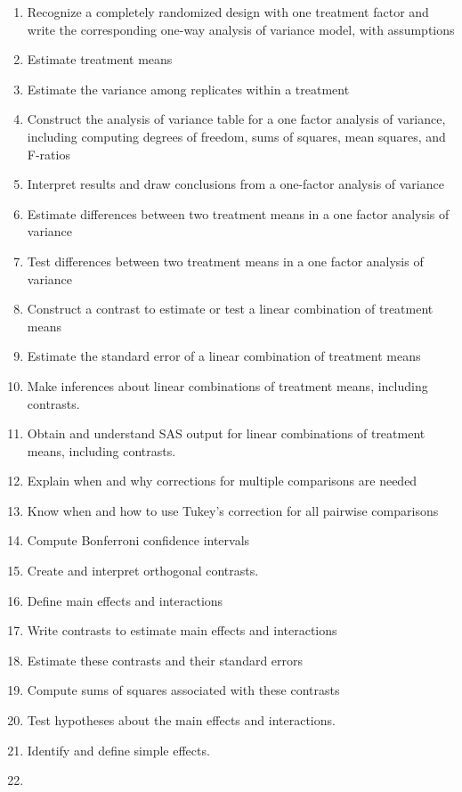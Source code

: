 \documentclass[]{book}
\begin{document}
\begin{enumerate}
\def\labelenumi{\arabic{enumi}.}
\item
  Recognize a completely randomized design with one treatment factor and write the corresponding one-way analysis of variance model, with assumptions
\item
  Estimate treatment means
\item
  Estimate the variance among replicates within a treatment
\item
  Construct the analysis of variance table for a one factor analysis of variance, including computing degrees of freedom, sums of squares, mean squares, and F-ratios
\item
  Interpret results and draw conclusions from a one-factor analysis of variance
\item
  Estimate differences between two treatment means in a one factor analysis of variance
\item
  Test differences between two treatment means in a one factor analysis of variance
\item
  Construct a contrast to estimate or test a linear combination of treatment means
\item
  Estimate the standard error of a linear combination of treatment means
\item
  Make inferences about linear combinations of treatment means, including contrasts.
\item
  Obtain and understand SAS output for linear combinations of treatment means, including contrasts.
\item
  Explain when and why corrections for multiple comparisons are needed
\item
  Know when and how to use Tukey's correction for all pairwise comparisons
\item
  Compute Bonferroni confidence intervals
\item
  Create and interpret orthogonal contrasts.
\item
  Define main effects and interactions
\item
  Write contrasts to estimate main effects and interactions
\item
  Estimate these contrasts and their standard errors
\item
  Compute sums of squares associated with these contrasts
\item
  Test hypotheses about the main effects and interactions.
\item
  Identify and define simple effects.
\item

\end{enumerate}
\end{document}
